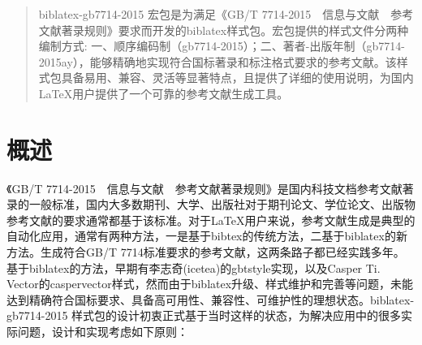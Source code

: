 \documentclass[11pt]{article} %
\begin{document}
\pagestyle{plain}




\titleandauthor

\begin{quotation}
biblatex-gb7714-2015 宏包是为满足《GB/T 7714-2015~~信息与文献~~参考文献著录规则》要求而开发的biblatex样式包。宏包提供的样式文件分两种编制方式: 一、顺序编码制（gb7714-2015）；二、著者-出版年制（gb7714-2015ay），能够精确地实现符合国标著录和标注格式要求的参考文献。该样式包具备易用、兼容、灵活等显著特点，且提供了详细的使用说明，为国内\LaTeX{}用户提供了一个可靠的参考文献生成工具。
\end{quotation}
\tableofcontents

\listoffigures
\listoftables
\listofegcode
\newlength{\textparwd}

\newpage
{}
\pagestyle{fancy}
\section{概述}

《GB/T 7714-2015~~信息与文献~~参考文献著录规则》是国内科技文档参考文献著录的一般标准，国内大多数期刊、大学、出版社对于期刊论文、学位论文、出版物参考文献的要求通常都基于该标准。对于\LaTeX{}用户来说，参考文献生成是典型的自动化应用，通常有两种方法，一是基于bibtex的传统方法，二基于biblatex的新方法。生成符合GB/T 7714标准要求的参考文献，这两条路子都已经实践多年。
基于biblatex的方法，早期有李志奇(icetea)的gbtstyle实现，以及Casper Ti. Vector的caspervector样式，然而由于biblatex升级、样式维护和完善等问题，未能达到精确符合国标要求、具备高可用性、兼容性、可维护性的理想状态。biblatex-gb7714-2015 样式包的设计初衷正式基于当时这样的状态，为解决应用中的很多实际问题，设计和实现考虑如下原则：
\end{document}
